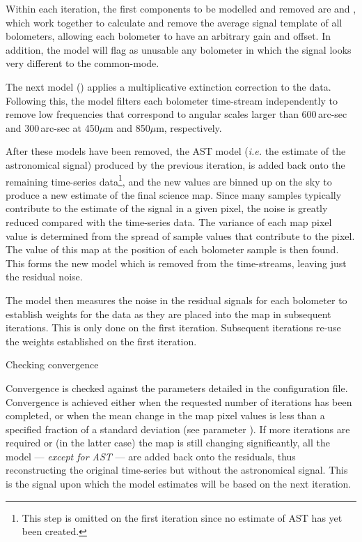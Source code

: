 \begin{enumdesc}
  Within each iteration, the first components to be modelled and removed
  are  and , which work together to calculate and
  remove the average signal template of all bolometers, allowing each
  bolometer to have an arbitrary gain and offset. In addition, the
   model will flag as unusable any bolometer in which the
  signal looks very different to the common-mode.

  The next model
  () applies a multiplicative extinction correction to the
  data. Following this, the  model filters each bolometer
  time-stream independently to remove low frequencies that correspond
  to angular scales larger than 600\,arc-sec and 300\,arc-sec at
  450$\mu$m and 850$\mu$m, respectively.

  After these models have been removed, the AST model (\emph{i.e.} the
  estimate of the astronomical signal) produced by the previous iteration,
  is added back onto the remaining time-series data\footnote{This step is
  omitted on the first iteration since no estimate of AST has yet been
  created.}, and the new values are binned up on the sky to produce a new
  estimate of the final science map.  Since many samples typically
  contribute to the estimate of the signal in a given pixel, the noise is
  greatly reduced compared with the time-series data. The variance of
  each map pixel value is determined from the spread of sample values
  that contribute to the pixel.  The value of this map at the position
  of each bolometer sample is then found. This forms the new 
  model which is removed from the time-streams, leaving just the residual
  noise.

  The  model then measures the noise in the residual signals
  for each bolometer to establish weights for the data as they are placed
  into the map in subsequent iterations. This is only done on the first
  iteration. Subsequent iterations re-use the weights established on the
  first iteration.

\item[Checking convergence]

  Convergence is checked against the parameters detailed in the
  configuration file. Convergence is achieved either when the requested
  number of iterations has been completed, or when the mean change in the
  map pixel values is less than a specified fraction of a standard
  deviation (see parameter ).  If more iterations
  are required or (in the latter case) the map is still changing
  significantly, all the model --- \emph{except for AST} --- are added
  back onto the residuals, thus reconstructing the original time-series
  but without the astronomical signal.  This is the signal upon which the
  model estimates will be based on the next iteration.

\end{enumdesc}


